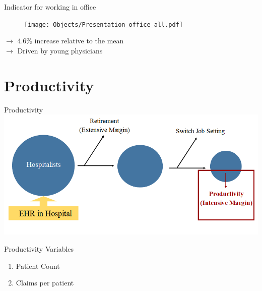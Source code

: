 \documentclass[10pt]{beamer}
\begin{document}
\begin{frame}{Indicator for working in office}
\begin{figure}[ht]
    \centering
    \texttt{[image: Objects/Presentation\_office\_all.pdf]}
\end{figure}
$\rightarrow$ 4.6\% increase relative to the mean\\
$\rightarrow$ Driven by young physicians
\end{frame}





\section{Productivity}





\begin{frame}{Productivity}
    \centering
    \includegraphics[scale=.45]{Objects/EHR_FlowChart_Productivity.PNG}
\end{frame}

\begin{frame}{Productivity Variables}
    \begin{enumerate}
        \item Patient Count
        \vspace{6mm}
        \item Claims per patient
    \end{enumerate}
\end{frame}
\end{document}
